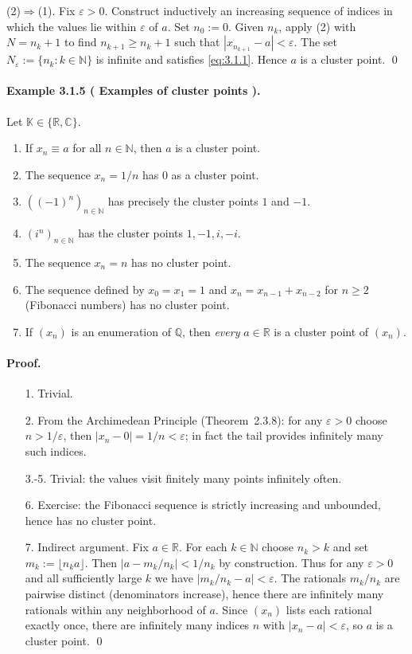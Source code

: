 \documentclass[12pt,a4paper]{article}
\newcommand{\N}{\mathbb{N}}
\newcommand{\Q}{\mathbb{Q}}
\newcommand{\R}{\mathbb{R}}
\newcommand{\C}{\mathbb{C}}
\newcommand{\K}{\mathbb{K}} %
\newcommand{\eps}{\varepsilon}
\newcommand{\NumberedExample}[3]{%
\paragraph*{Example #1 ( #2 ).} #3\par}
\theoremstyle{plain}
\theoremstyle{definition}
\theoremstyle{remark}
\begin{document}
(2)$\Rightarrow$(1). Fix $\eps>0$. Construct inductively an increasing sequence of indices in which the values lie within $\eps$ of $a$. Set $n_0:=0$. Given $n_k$, apply (2) with $N=n_k+1$ to find $n_{k+1}\ge n_k+1$ such that $|x_{n_{k+1}}-a|<\eps$. The set $N_\eps:=\{ n_k : k\in\N\}$ is infinite and satisfies \eqref{eq:3.1.1}. Hence $a$ is a cluster point. \qed

\NumberedExample{3.1.5}{Examples of cluster points}{Let $\K\in\{\R,\C\}$.
\begin{enumerate}[label={({\arabic*})}, leftmargin=*]
	\item If $x_n\equiv a$ for all $n\in\N$, then $a$ is a cluster point.
	\item The sequence $x_n=1/n$ has $0$ as a cluster point.
	\item $((-1)^n)_{n\in\N}$ has precisely the cluster points $1$ and $-1$.
	\item $(i^n)_{n\in\N}$ has the cluster points $1,-1,i,-i$.
	\item The sequence $x_n=n$ has no cluster point.
	\item The sequence defined by $x_0=x_1=1$ and $x_n=x_{n-1}+x_{n-2}$ for $n\ge2$ (Fibonacci numbers) has no cluster point.
	\item If $(x_n)$ is an enumeration of $\Q$, then \emph{every} $a\in\R$ is a cluster point of $(x_n)$.
\end{enumerate}}

\paragraph{Proof.}
\begin{enumerate}[label={(\arabic*)}, leftmargin=*]
	\item[1.] Trivial.
	\item[2.] From the Archimedean Principle (Theorem~2.3.8): for any $\eps>0$ choose $n>1/\eps$, then $|x_n-0|=1/n<\eps$; in fact the tail provides infinitely many such indices.
	\item[3.-5.] Trivial: the values visit finitely many points infinitely often.
	\item[6.] Exercise: the Fibonacci sequence is strictly increasing and unbounded, hence has no cluster point.
	\item[7.] Indirect argument. Fix $a\in\R$. For each $k\in\N$ choose $n_k>k$ and set $m_k:=\lfloor n_k a\rfloor$. Then $\big| a - m_k/n_k\big|<1/n_k$ by construction. Thus for any $\eps>0$ and all sufficiently large $k$ we have $\big| m_k/n_k - a\big|<\eps$. The rationals $m_k/n_k$ are pairwise distinct (denominators increase), hence there are infinitely many rationals within any neighborhood of $a$. Since $(x_n)$ lists each rational exactly once, there are infinitely many indices $n$ with $|x_n-a|<\eps$, so $a$ is a cluster point. \qed
\end{enumerate}
\end{document}
